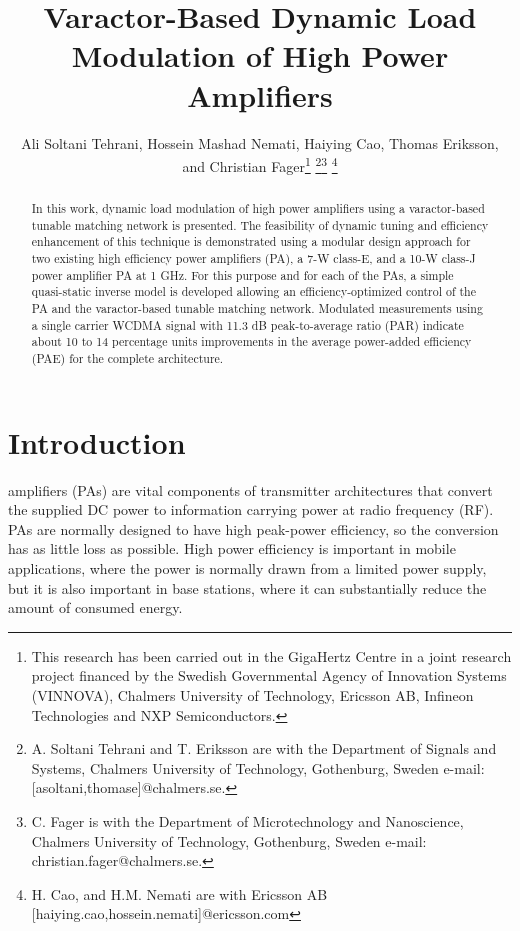 \documentclass[10pt,journal]{IEEEtran}
\begin{document}
\title{Varactor-Based Dynamic Load Modulation of High Power Amplifiers}


\author{Ali Soltani Tehrani, Hossein Mashad Nemati, Haiying Cao,  Thomas Eriksson, and Christian Fager\thanks{This research has been carried out in the GigaHertz Centre in a joint research project financed by the Swedish Governmental Agency of Innovation Systems (VINNOVA), Chalmers University of Technology, Ericsson AB, Infineon Technologies and NXP Semiconductors.}
\thanks{A. Soltani Tehrani and T. Eriksson are with the Department
of Signals and Systems, Chalmers University of Technology,
Gothenburg, Sweden e-mail: [asoltani,thomase]@chalmers.se.}\thanks{C. Fager is with the Department of Microtechnology and Nanoscience, Chalmers University of Technology, Gothenburg, Sweden e-mail: christian.fager@chalmers.se.} 
\thanks{H. Cao, and H.M. Nemati are with Ericsson AB [haiying.cao,hossein.nemati]@ericsson.com}}




\maketitle


\begin{abstract}
In this work, dynamic load modulation of high power amplifiers using a varactor-based
tunable matching network is presented. The feasibility of dynamic tuning and
efficiency enhancement of this technique is demonstrated using a modular design
approach for two existing high efficiency power amplifiers (PA), a 7-W class-E, and a 10-W class-J power amplifier PA at 1 GHz. For this purpose and for each of the PAs, a simple quasi-static inverse model is developed allowing an efficiency-optimized control of the PA and the varactor-based tunable matching network. Modulated measurements using a single carrier WCDMA signal with 11.3 dB peak-to-average ratio (PAR) indicate about 10 to 14 percentage units improvements in the average power-added efficiency (PAE) for the complete architecture.

\end{abstract}

\IEEEpeerreviewmaketitle



\section{Introduction}
 amplifiers (PAs) are vital components of transmitter architectures that convert the supplied DC power to information carrying power at radio frequency (RF). PAs are normally designed to have high peak-power efficiency, so the conversion has as little loss as possible. High power efficiency is important in mobile applications, where the power is normally drawn from a limited power supply, but it is also important in base stations, where it can substantially reduce the amount of consumed energy.
\end{document}

